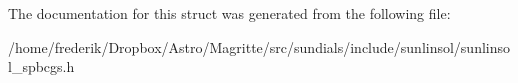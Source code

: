The documentation for this struct was generated from the following file\+:\begin{DoxyCompactItemize}
\item 
/home/frederik/\+Dropbox/\+Astro/\+Magritte/src/sundials/include/sunlinsol/sunlinsol\+\_\+spbcgs.\+h\end{DoxyCompactItemize}
